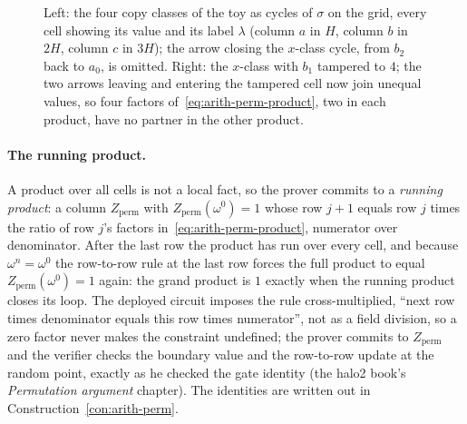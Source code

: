 \documentclass[11pt,a4paper]{article}
\theoremstyle{definition}
\begin{document}
\begin{figure}[htbp]
\caption{Left: the four copy classes of the toy as cycles of $\sigma$ on
the grid, every cell showing its value and its label $\lambda$ (column $a$
in $H$, column $b$ in $2H$, column $c$ in $3H$); the arrow closing the
$x$-class cycle, from $b_2$ back to $a_0$, is omitted. Right: the $x$-class
with $b_1$ tampered to $4$; the two arrows leaving and entering the
tampered cell now join unequal values, so four factors
of~\eqref{eq:arith-perm-product}, two in each product, have no partner
in the other product.}
\label{fig:perm-cycles}
\end{figure}

\paragraph{The running product.}
A product over all cells is not a local fact, so the prover commits to a
\emph{running product}: a column $Z_{\mathrm{perm}}$ with
$Z_{\mathrm{perm}}(\omega^0) = 1$ whose row $j + 1$ equals row $j$ times
the ratio of row $j$'s factors in~\eqref{eq:arith-perm-product},
numerator over denominator. After the last row the product has run over
every cell, and because $\omega^n = \omega^0$ the row-to-row rule at the
last row forces the full product to equal $Z_{\mathrm{perm}}(\omega^0) = 1$
again: the grand product is $1$ exactly when the running product closes
its loop. The deployed circuit imposes the rule cross-multiplied,
``next row times denominator equals this row times numerator'', not as a
field division, so a zero factor never makes the constraint undefined;
the prover commits to $Z_{\mathrm{perm}}$ and the verifier checks the
boundary value and the row-to-row update at the random point, exactly as
he checked the gate identity (the halo2 book's \emph{Permutation argument}
chapter). The identities are written out in
Construction~\ref{con:arith-perm}.
\end{document}
